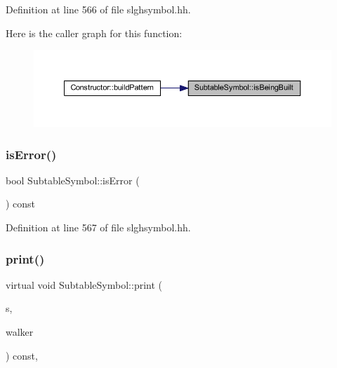 Definition at line 566 of file slghsymbol.\+hh.

Here is the caller graph for this function\+:
\nopagebreak
\begin{figure}[H]
\begin{center}
\leavevmode
\includegraphics[width=350pt]{class_subtable_symbol_a450730a12be8f17b67c32d4dce1b7638_icgraph}
\end{center}
\end{figure}
\mbox{\label{class_subtable_symbol_a275e20fff6be4489a1ffdb30770e85cd}} 
\subsubsection{\texorpdfstring{isError()}{isError()}}
{\footnotesize\ttfamily bool Subtable\+Symbol\+::is\+Error (\begin{DoxyParamCaption}\item[{void}]{ }\end{DoxyParamCaption}) const\hspace{0.3cm}{\ttfamily [inline]}}



Definition at line 567 of file slghsymbol.\+hh.

\mbox{\label{class_subtable_symbol_a26cbcfbd3b82eddffb9ba3c3beb0b5ac}} 
\subsubsection{\texorpdfstring{print()}{print()}}
{\footnotesize\ttfamily virtual void Subtable\+Symbol\+::print (\begin{DoxyParamCaption}\item[{ostream \&}]{s,  }\item[{\mbox{\hyperlink{class_parser_walker}{Parser\+Walker}} \&}]{walker }\end{DoxyParamCaption}) const\hspace{0.3cm}{\ttfamily [inline]}, {\ttfamily [virtual]}}



